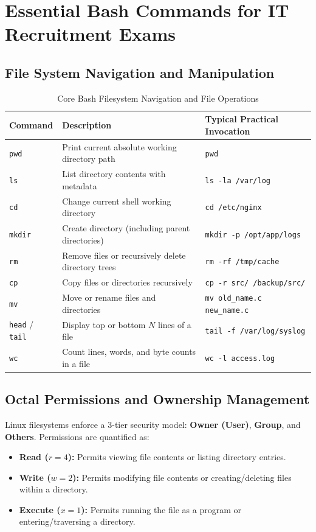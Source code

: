 \section{Essential Bash Commands for IT Recruitment Exams}
\label{sec:bash_commands_it_exams}

\subsection{File System Navigation and Manipulation}
\begin{table}[htbp]
\centering
\small
\begin{tabularx}{\textwidth}{l X l}
\toprule
\textbf{Command} & \textbf{Description} & \textbf{Typical Practical Invocation} \\
\midrule
\texttt{pwd} & Print current absolute working directory path & \texttt{pwd} \\
\texttt{ls} & List directory contents with metadata & \texttt{ls -la /var/log} \\
\texttt{cd} & Change current shell working directory & \texttt{cd /etc/nginx} \\
\texttt{mkdir} & Create directory (including parent directories) & \texttt{mkdir -p /opt/app/logs} \\
\texttt{rm} & Remove files or recursively delete directory trees & \texttt{rm -rf /tmp/cache} \\
\texttt{cp} & Copy files or directories recursively & \texttt{cp -r src/ /backup/src/} \\
\texttt{mv} & Move or rename files and directories & \texttt{mv old\_name.c new\_name.c} \\
\texttt{head} / \texttt{tail} & Display top or bottom $N$ lines of a file & \texttt{tail -f /var/log/syslog} \\
\texttt{wc} & Count lines, words, and byte counts in a file & \texttt{wc -l access.log} \\
\bottomrule
\end{tabularx}
\caption{Core Bash Filesystem Navigation and File Operations}
\label{tab:bash_file_commands}
\end{table}

\subsection{Octal Permissions and Ownership Management}
Linux filesystems enforce a 3-tier security model: \textbf{Owner (User)}, \textbf{Group}, and \textbf{Others}. Permissions are quantified as:
\begin{itemize}[leftmargin=*]
    \item \textbf{Read ($r = 4$):} Permits viewing file contents or listing directory entries.
    \item \textbf{Write ($w = 2$):} Permits modifying file contents or creating/deleting files within a directory.
    \item \textbf{Execute ($x = 1$):} Permits running the file as a program or entering/traversing a directory.
\end{itemize}

